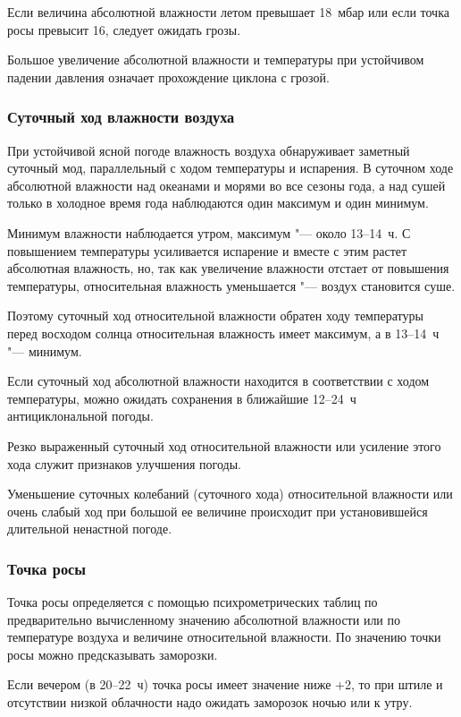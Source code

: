  Если величина абсолютной влажности летом превышает 18~мбар или
если точка росы превысит 16\gr, следует ожидать грозы.

 Большое увеличение абсолютной влажности и температуры при
устойчивом падении давления означает прохождение циклона с грозой.

\subsubsection{Суточный ход влажности воздуха}

При устойчивой ясной погоде влажность воздуха обнаруживает заметный
суточный мод, параллельный с ходом температуры и испарения. В суточном
ходе абсолютной влажности над океанами и морями во все сезоны года, а
над сушей только в холодное время года наблюдаются один максимум и
один минимум.

Минимум влажности наблюдается утром, максимум "--- около 13--14~ч. С
повышением температуры усиливается испарение и вместе с этим растет
абсолютная влажность, но, так как увеличение влажности отстает от
повышения температуры, относительная влажность уменьшается "--- воздух
становится суше.

Поэтому суточный ход относительной влажности обратен ходу температуры
перед восходом солнца относительная влажность имеет максимум, а в
13--14~ч "--- минимум.

 Если суточный ход абсолютной влажности находится в
соответствии с ходом температуры, можно ожидать сохранения в ближайшие
12--24~ч антициклональной погоды.

 Резко выраженный суточный ход относительной влажности или
усиление этого хода служит признаков улучшения погоды.

 Уменьшение суточных колебаний (суточного хода) относительной
влажности или очень слабый ход при большой ее величине происходит при
установившейся длительной ненастной погоде.

\subsubsection{Точка росы}

Точка росы определяется с помощью психрометрических таблиц по
предварительно вычисленному значению абсолютной влажности или по
температуре воздуха и величине относительной влажности. По значению
точки росы можно предсказывать заморозки.

 Если вечером (в 20--22~ч) точка росы имеет значение ниже +2\gr, то
при штиле и отсутствии низкой облачности надо ожидать заморозок ночью
или к утру.

